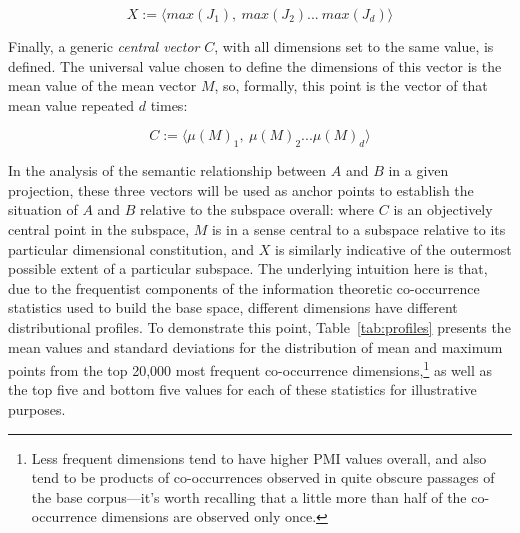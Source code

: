 \begin{equation}
X := \langle max(J_{1}),\ max(J_{2})...\ max(J_{d})\rangle
\end{equation}

\noindent Finally, a generic \emph{central vector} $C$, with all dimensions set to the same value, is defined.  The universal value chosen to define the dimensions of this vector is the mean value of the mean vector $M$, so, formally, this point is the vector of that mean value repeated $d$ times:

\begin{equation}
C := \langle\mu(M)_1,\ \mu(M)_2... \mu(M)_d\rangle
\end{equation}

\noindent In the analysis of the semantic relationship between $A$ and $B$ in a given projection, these three vectors will be used as anchor points to establish the situation of $A$ and $B$ relative to the subspace overall: where $C$ is an objectively central point in the subspace, $M$ is in a sense central to a subspace relative to its particular dimensional constitution, and $X$ is similarly indicative of the outermost possible extent of a particular subspace.  The underlying intuition here is that, due to the frequentist components of the information theoretic co-occurrence statistics used to build the base space, different dimensions have different distributional profiles.  To demonstrate this point, Table~\ref{tab:profiles} presents the mean values and standard deviations for the distribution of mean and maximum points from the top 20,000 most frequent co-occurrence dimensions,\footnote{Less frequent dimensions tend to have higher PMI values overall, and also tend to be products of co-occurrences observed in quite obscure passages of the base corpus---it's worth recalling that a little more than half of the co-occurrence dimensions are observed only once.} as well as the top five and bottom five values for each of these statistics for illustrative purposes.


